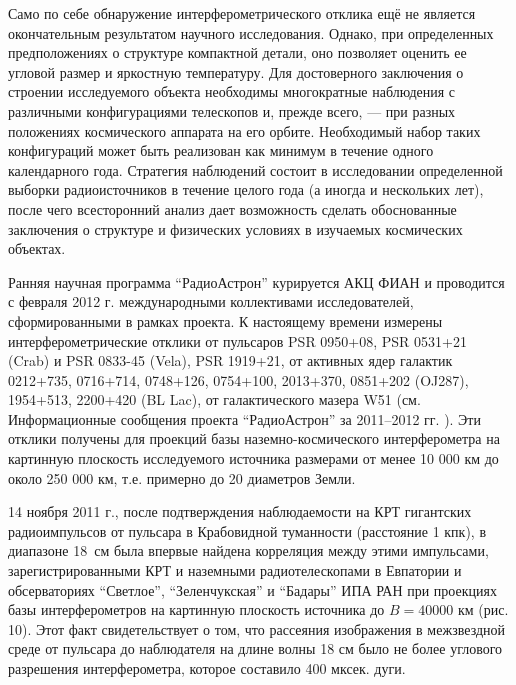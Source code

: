 Само по себе обнаружение интерферометрического отклика ещё не является окончательным результатом
научного исследования. Однако, при определенных предположениях о структуре компактной детали, оно
позволяет оценить ее угловой размер и яркостную температуру. Для достоверного заключения о строении
исследуемого объекта необходимы многократные наблюдения с различными конфигурациями телескопов и,
прежде всего, --- при разных положениях космического аппарата на его орбите. Необходимый набор таких
конфигураций может быть реализован как минимум в течение одного календарного года. Стратегия
наблюдений состоит в исследовании определенной выборки радиоисточников в течение целого года (а
иногда и нескольких лет), после чего всесторонний анализ дает возможность сделать обоснованные
заключения о структуре и физических условиях в изучаемых космических объектах.

Ранняя научная программа ``РадиоАстрон'' курируется АКЦ ФИАН и проводится с февраля 2012 г.
международными коллективами исследователей, сформированными в рамках проекта. К настоящему времени
измерены интерферометрические отклики от пульсаров PSR 0950+08, PSR 0531+21 (Crab) и PSR 0833-45
(Vela), PSR 1919+21, от активных ядер галактик 0212+735, 0716+714, 0748+126, 0754+100, 2013+370,
0851+202 (OJ287), 1954+513, 2200+420 (BL Lac), от галактического мазера W51 (см. Информационные
сообщения проекта ``РадиоАстрон'' за 2011--2012 гг. \cite{RA_news}). Эти отклики получены для
проекций базы наземно-космического интерферометра на картинную плоскость исследуемого источника
размерами от менее 10 000 км до около 250 000 км, т.е. примерно до 20 диаметров Земли.

14 ноября 2011 г., после подтверждения наблюдаемости на КРТ гигантских радиоимпульсов от пульсара в
Крабовидной туманности (расстояние 1 кпк), в диапазоне 18~см была впервые найдена корреляция между
этими импульсами, зарегистрированными КРТ и наземными радиотелескопами в Евпатории и обсерваториях
``Светлое'', ``Зеленчукская'' и ``Бадары'' ИПА РАН при проекциях базы интерферометров на картинную
плоскость источника до $B = 40 000$ км (рис. 10). Этот факт свидетельствует о том, что рассеяния
изображения в межзвездной среде от пульсара до наблюдателя на длине волны 18 см было не более
углового разрешения интерферометра, которое составило 400 мксек. дуги.

